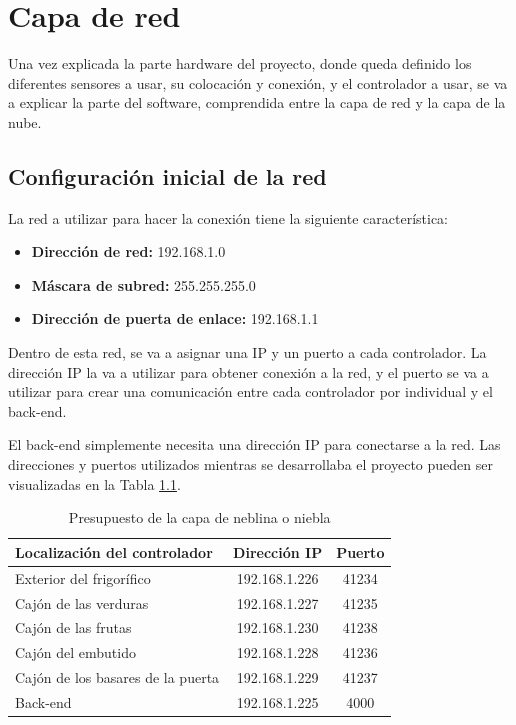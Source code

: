 \chapter{Capa de red}
Una vez explicada la parte hardware del proyecto, donde queda definido los diferentes sensores a usar, su colocación y conexión, y el controlador a usar, se va a explicar la parte del software, comprendida entre la capa de red y la capa de la nube.

\section{Configuración inicial de la red}

La red a utilizar para hacer la conexión tiene la siguiente característica:
\begin{itemize}
    \item \textbf{Dirección de red:} 192.168.1.0
    \item \textbf{Máscara de subred:} 255.255.255.0
    \item \textbf{Dirección de puerta de enlace:} 192.168.1.1
\end{itemize}

Dentro de esta red, se va a asignar una IP y un puerto a cada controlador. La dirección IP la va a utilizar para obtener conexión a la red, y el puerto se va a utilizar para crear una comunicación entre cada controlador por individual y el back-end.

El back-end simplemente necesita una dirección IP para conectarse a la red. Las direcciones y puertos utilizados mientras se desarrollaba el proyecto pueden ser visualizadas en la Tabla \ref{tab:port}.

\begin{table}[h]
    \centering
    \begin{tabular}{|l|c|c|}
        \rowcolor[gray]{.5}
        \hline
            \color{white}Localización del controlador&\color{white}Dirección IP&\color{white}Puerto  \\
        \hline
            Exterior del frigorífico&192.168.1.226&41234  \\
        \hline    
            Cajón de las verduras&192.168.1.227&41235  \\
        \hline    
            Cajón de las frutas&192.168.1.230&41238  \\
        \hline   
            Cajón del embutido&192.168.1.228&41236  \\
        \hline
            Cajón de los basares de la puerta&192.168.1.229&41237 \\
        \hline
            Back-end&192.168.1.225&4000 \\
        \hline
    \end{tabular}
    \caption{Presupuesto de la capa de neblina o niebla}
    \label{tab:port}
\end{table}


